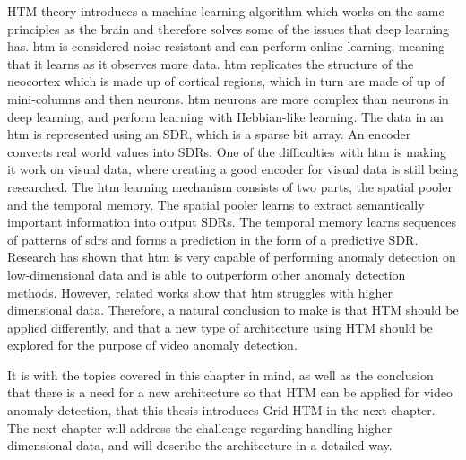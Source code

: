 HTM theory introduces a machine learning algorithm which works on the same principles as the brain and therefore solves some of the issues that deep learning has. \gls*{htm} is considered noise resistant and can perform online learning, meaning that it learns as it observes more data. \gls*{htm} replicates the structure of the neocortex which is made up of cortical regions, which in turn are made of up of mini-columns and then neurons. \gls*{htm} neurons are more complex than neurons in deep learning, and perform learning with Hebbian-like learning. The data in an \gls*{htm} is represented using an SDR, which is a sparse bit array. An encoder converts real world values into SDRs. One of the difficulties with \gls*{htm} is making it work on visual data, where creating a good encoder for visual data is still being researched. The \gls*{htm} learning mechanism consists of two parts, the spatial pooler and the temporal memory. The spatial pooler learns to extract semantically important information into output SDRs. The temporal memory learns sequences of patterns of \glspl*{sdr} and forms a prediction in the form of a predictive SDR. Research has shown that \gls*{htm} is very capable of performing anomaly detection on low-dimensional data and is able to outperform other anomaly detection methods. However, related works show that \gls*{htm} struggles with higher dimensional data. Therefore, a natural conclusion to make is that HTM should be applied differently, and that a new type of architecture using HTM should be explored for the purpose of video anomaly detection.
\par
It is with the topics covered in this chapter in mind, as well as the conclusion that there is a need for a new architecture so that HTM can be applied for video anomaly detection, that this thesis introduces Grid HTM in the next chapter. The next chapter will address the challenge regarding handling higher dimensional data, and will describe the architecture in a detailed way.